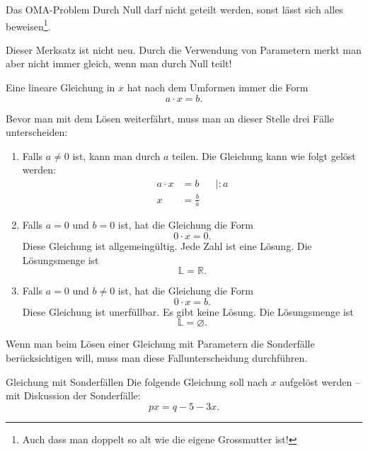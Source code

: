 \clearpage
\begin{satz}{Das OMA-Problem}{}
    Durch Null darf nicht geteilt werden, sonst lässt sich alles beweisen\footnote{Auch dass man doppelt so alt wie die eigene Grossmutter ist!}.
\end{satz}

Dieser Merksatz ist nicht neu. Durch die Verwendung von Parametern merkt man aber nicht immer gleich, wenn man durch Null teilt!

Eine lineare Gleichung in \(x\) hat nach dem Umformen immer die Form
\[
    a\cdot x=b.
\]

Bevor man mit dem Lösen weiterfährt, muss man an dieser Stelle drei Fälle unterscheiden:

\begin{enumerate}
    \item Falls \(a\neq 0\) ist, kann man durch \(a\) teilen. Die Gleichung kann wie folgt gelöst werden:
          \[
              \begin{aligned}
                  a\cdot x & = b           &  & \mid :a \\
                  x        & = \frac{b}{a}
              \end{aligned}
          \]

    \item Falls \(a=0\) und \(b=0\) ist, hat die Gleichung die Form
          \[
              0\cdot x=0.
          \]
          Diese Gleichung ist allgemeingültig. Jede Zahl ist eine Lösung. Die Lösungsmenge ist
          \[
              \mathbb{L}=\mathbb{R}.
          \]

    \item Falls \(a=0\) und \(b\neq 0\) ist, hat die Gleichung die Form
          \[
              0\cdot x=b.
          \]
          Diese Gleichung ist unerfüllbar. Es gibt keine Lösung. Die Lösungsmenge ist
          \[
              \mathbb{L}=\varnothing.
          \]
\end{enumerate}

Wenn man beim Lösen einer Gleichung mit Parametern die Sonderfälle berücksichtigen will, muss man diese Fallunterscheidung durchführen.
\clearpage
\begin{bsp}{Gleichung mit Sonderfällen}{}
    Die folgende Gleichung soll nach \(x\) aufgelöst werden -- mit Diskussion der Sonderfälle:
    \[
        px=q-5-3x.
    \]
    \vspace*{5cm}
\end{bsp}

